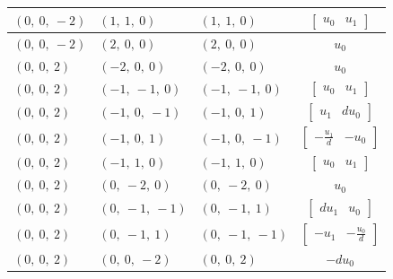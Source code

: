 \documentclass[11pt]{article}
\theoremstyle{definition}
\begin{document}
\begin{longtable}{|l|l|l|c|}
    \hline
    $\left( 0, \  0, \  -2\right)$ & $\left( 1, \  1, \  0\right)$ & $\left( 1, \  1, \  0\right)$ & $\left[\begin{matrix}u_{0} & u_{1}\end{matrix}\right]$ \\
    \hline
    $\left( 0, \  0, \  -2\right)$ & $\left( 2, \  0, \  0\right)$ & $\left( 2, \  0, \  0\right)$ & $u_{0}$ \\
    \hline
    $\left( 0, \  0, \  2\right)$ & $\left( -2, \  0, \  0\right)$ & $\left( -2, \  0, \  0\right)$ & $u_{0}$ \\
    \hline
    $\left( 0, \  0, \  2\right)$ & $\left( -1, \  -1, \  0\right)$ & $\left( -1, \  -1, \  0\right)$ & $\left[\begin{matrix}u_{0} & u_{1}\end{matrix}\right]$ \\
    \hline
    $\left( 0, \  0, \  2\right)$ & $\left( -1, \  0, \  -1\right)$ & $\left( -1, \  0, \  1\right)$ & $\left[\begin{matrix}u_{1} & d u_{0}\end{matrix}\right]$ \\
    \hline
    $\left( 0, \  0, \  2\right)$ & $\left( -1, \  0, \  1\right)$ & $\left( -1, \  0, \  -1\right)$ & $\left[\begin{matrix}- \frac{u_{1}}{d} & - u_{0}\end{matrix}\right]$ \\
    \hline
    $\left( 0, \  0, \  2\right)$ & $\left( -1, \  1, \  0\right)$ & $\left( -1, \  1, \  0\right)$ & $\left[\begin{matrix}u_{0} & u_{1}\end{matrix}\right]$ \\
    \hline
    $\left( 0, \  0, \  2\right)$ & $\left( 0, \  -2, \  0\right)$ & $\left( 0, \  -2, \  0\right)$ & $u_{0}$ \\
    \hline
    $\left( 0, \  0, \  2\right)$ & $\left( 0, \  -1, \  -1\right)$ & $\left( 0, \  -1, \  1\right)$ & $\left[\begin{matrix}d u_{1} & u_{0}\end{matrix}\right]$ \\
    \hline
    $\left( 0, \  0, \  2\right)$ & $\left( 0, \  -1, \  1\right)$ & $\left( 0, \  -1, \  -1\right)$ & $\left[\begin{matrix}- u_{1} & - \frac{u_{0}}{d}\end{matrix}\right]$ \\
    \hline
    $\left( 0, \  0, \  2\right)$ & $\left( 0, \  0, \  -2\right)$ & $\left( 0, \  0, \  2\right)$ & $- d u_{0}$ \\

\end{longtable}
\end{document}
